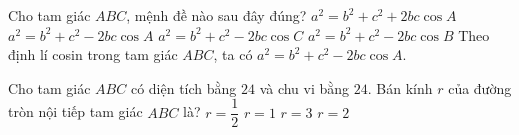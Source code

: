 \begin{ex}%
	Cho tam giác $ABC$, mệnh đề nào sau đây đúng?
	\choice
	{$a^2= b^2+c^2+2bc\cos A$}
	{\True $a^2= b^2+c^2 - 2bc\cos A$}
	{$a^2= b^2+c^2-2bc\cos C$}
	{$a^2= b^2+c^2- 2bc\cos B$}
	\loigiai
	{
		Theo định lí cosin trong tam giác $ABC$, ta có $a^2= b^2+c^2-2bc \cos A$.
	}
\end{ex}
\begin{ex}%
	Cho tam giác $ABC$ có diện tích bằng $24$ và chu vi bằng $24$. Bán kính $r$ của đường tròn nội tiếp tam giác $ABC$ là?
	\choice
	{$r=\dfrac{1}{2}$}
	{$r=1$}
	{$r=3$}
	{\True $r=2$}
\end{ex}
